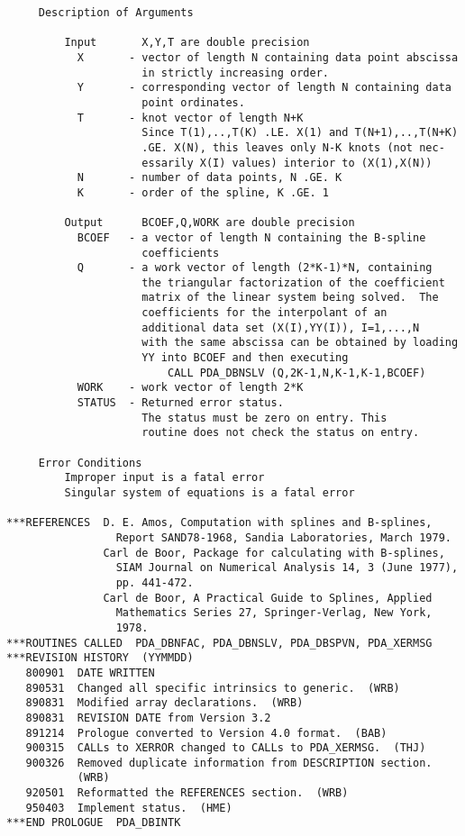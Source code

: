 \begin{verbatim}
     Description of Arguments

         Input       X,Y,T are double precision
           X       - vector of length N containing data point abscissa
                     in strictly increasing order.
           Y       - corresponding vector of length N containing data
                     point ordinates.
           T       - knot vector of length N+K
                     Since T(1),..,T(K) .LE. X(1) and T(N+1),..,T(N+K)
                     .GE. X(N), this leaves only N-K knots (not nec-
                     essarily X(I) values) interior to (X(1),X(N))
           N       - number of data points, N .GE. K
           K       - order of the spline, K .GE. 1

         Output      BCOEF,Q,WORK are double precision
           BCOEF   - a vector of length N containing the B-spline
                     coefficients
           Q       - a work vector of length (2*K-1)*N, containing
                     the triangular factorization of the coefficient
                     matrix of the linear system being solved.  The
                     coefficients for the interpolant of an
                     additional data set (X(I),YY(I)), I=1,...,N
                     with the same abscissa can be obtained by loading
                     YY into BCOEF and then executing
                         CALL PDA_DBNSLV (Q,2K-1,N,K-1,K-1,BCOEF)
           WORK    - work vector of length 2*K
           STATUS  - Returned error status.
                     The status must be zero on entry. This
                     routine does not check the status on entry.

     Error Conditions
         Improper input is a fatal error
         Singular system of equations is a fatal error

***REFERENCES  D. E. Amos, Computation with splines and B-splines,
                 Report SAND78-1968, Sandia Laboratories, March 1979.
               Carl de Boor, Package for calculating with B-splines,
                 SIAM Journal on Numerical Analysis 14, 3 (June 1977),
                 pp. 441-472.
               Carl de Boor, A Practical Guide to Splines, Applied
                 Mathematics Series 27, Springer-Verlag, New York,
                 1978.
***ROUTINES CALLED  PDA_DBNFAC, PDA_DBNSLV, PDA_DBSPVN, PDA_XERMSG
***REVISION HISTORY  (YYMMDD)
   800901  DATE WRITTEN
   890531  Changed all specific intrinsics to generic.  (WRB)
   890831  Modified array declarations.  (WRB)
   890831  REVISION DATE from Version 3.2
   891214  Prologue converted to Version 4.0 format.  (BAB)
   900315  CALLs to XERROR changed to CALLs to PDA_XERMSG.  (THJ)
   900326  Removed duplicate information from DESCRIPTION section.
           (WRB)
   920501  Reformatted the REFERENCES section.  (WRB)
   950403  Implement status.  (HME)
***END PROLOGUE  PDA_DBINTK
\end{verbatim}

